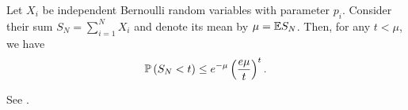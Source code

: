 \begin{theorem}
\label{Theorem_Chernoff_Inequality}
Let $X_i$ be independent Bernoulli random variables with parameter $p_i$. 
Consider their sum $S_N=\sum_{i=1}^N X_i$ and denote its mean by $\mu={\mathbb E} S_N$. 
Then, for any $t<\mu$, we have
$$
{\mathbb P}\left({S_N<t}\right)\leq e^{-\mu}\left({\frac{e\mu}{t}}\right)^t.
$$
\end{theorem}
See \cite{vershynin_2018}.
\endproof